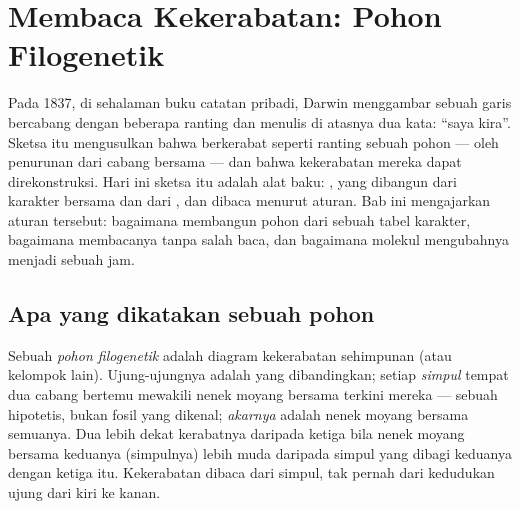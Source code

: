 \chapter{Membaca Kekerabatan: Pohon Filogenetik}\label{ch:g12:phylogenetic-trees}

Pada 1837, di sehalaman buku catatan pribadi, Darwin menggambar sebuah
garis bercabang dengan beberapa ranting dan menulis di atasnya dua
kata: ``saya kira''. Sketsa itu mengusulkan bahwa  berkerabat
seperti ranting sebuah pohon --- oleh penurunan dari cabang bersama
--- dan bahwa kekerabatan mereka dapat direkonstruksi. Hari ini sketsa
itu adalah alat baku: , yang dibangun dari karakter
bersama dan dari , dan dibaca menurut aturan. Bab ini mengajarkan
aturan tersebut: bagaimana membangun pohon dari sebuah tabel karakter,
bagaimana membacanya tanpa salah baca, dan bagaimana molekul
mengubahnya menjadi sebuah jam.

\section{Apa yang dikatakan sebuah pohon}

\begin{definition}\label{def:g12:phylogenetic-trees:tree}
Sebuah \emph{pohon filogenetik} adalah
diagram kekerabatan sehimpunan  (atau kelompok lain).
Ujung-ujungnya adalah  yang dibandingkan; setiap \emph{simpul}
tempat dua cabang bertemu mewakili nenek moyang bersama terkini mereka
--- sebuah  hipotetis, bukan fosil yang dikenal;
\emph{akarnya} adalah nenek moyang bersama semuanya. Dua  lebih
dekat kerabatnya daripada  ketiga bila nenek moyang bersama
keduanya (simpulnya) lebih muda daripada simpul yang dibagi keduanya
dengan  ketiga itu. Kekerabatan dibaca dari simpul, tak pernah
dari kedudukan ujung dari kiri ke kanan.
\end{definition}

